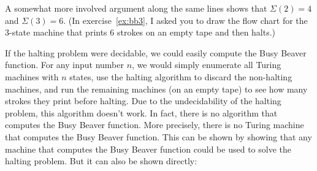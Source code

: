 A somewhat more involved argument along the same lines shows that $\Sigma(2) = 4$
and $\Sigma(3) = 6$.
(In exercise~\ref{ex:bb3},
I asked you to draw the flow chart for the 3-state machine that prints 6 strokes
on an empty tape and then halts.)

If the halting problem were decidable,
we could easily compute the Busy Beaver function.
For any input number $n$,
we would simply enumerate all Turing machines with $n$ states,
use the halting algorithm to discard the non-halting machines,
and run the remaining machines (on an empty tape)
to see how many strokes they print before halting.
Due to the undecidability of the halting problem,
this algorithm doesn't work.
In fact,
there is no algorithm that computes the Busy Beaver function.
More precisely,
there is no Turing machine that computes the Busy Beaver function.
This can be shown by
showing that any machine that computes the Busy Beaver function
could be used to solve the halting problem.
But it can also be shown directly:

